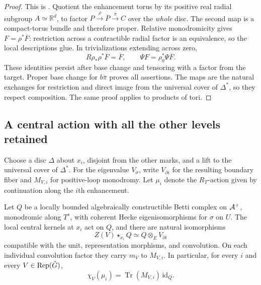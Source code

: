 \begin{proof}
This is \cite[Lemma~7.3]{CT}.  Quotient the enhancement torus by its
positive real radial subgroup $A\simeq\mathbb R^d$, to factor
$P\xrightarrow{\rho}\overline P\xrightarrow{\bar\pi}C$ over the
\emph{whole} disc.  The second map is a compact-torus bundle and
therefore proper.  Relative monodromicity gives
$F=\rho^*\overline F$: restriction across a contractible radial
factor is an equivalence, so the local descriptions glue.  In
trivializations extending across zero,
\[
 R\rho_*\rho^*\overline F=\overline F,
            \qquad \Psi F=\rho_0^*\Psi\overline F.
\]
These identities persist after base change and tensoring with a
factor from the target.  Proper base change for $b\bar\pi$ proves
all assertions.  The maps are the natural exchanges for restriction
and direct image from the universal cover of $\Delta^*$, so they
respect composition.  The same proof applies to products of tori.
\end{proof}

\subsection{A central action with all the other levels retained}

Choose a disc $\Delta$ about $x_i$, disjoint from the other marks,
and a lift to the universal cover of $\Delta^*$.  For the eigenvalue
$V_\sigma$, write $V_{\partial i}$ for the resulting boundary fiber
and $M_{V,i}$ for positive-loop monodromy.  Let $\mu_i$ denote the
$R_T$-action given by continuation along the $i$th enhancement.

\begin{lemma}\label{desc:trace}
Let $Q$ be a locally bounded algebraically constructible Betti
complex on $\mathcal A^+$, monodromic along $T^s$,
with coherent Hecke eigenisomorphisms for $\sigma$ on $U$.  The local
central kernels at $x_i$ act on $Q$, and there are natural
isomorphisms
\begin{equation}\label{desc:central-eigen}
          Z(V)\star_{x_i}Q\simeq Q\otimes_E V_{\partial i}
\end{equation}
compatible with the unit, representation morphisms, and convolution.
On each individual convolution factor they carry $m_V$ to $M_{V,i}$.
In particular, for every $i$ and every $V\in\operatorname{Rep}(\check G)$,
\begin{equation}\label{desc:character-trace}
              \chi_V(\mu_i)=\operatorname{Tr}(M_{V,i})\,\mathrm{id}_Q.
\end{equation}
\end{lemma}

